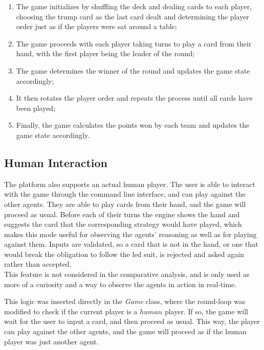 \documentclass[sigconf]{acmart}
\begin{document}
\begin{itemize}
  \begin{enumerate}[label=\arabic*]
    \item The game initializes by shuffling the deck and dealing cards to each player, choosing the trump card as the last card dealt and determining the player order just as if the players were sat around a table;
    \item The game proceeds with each player taking turns to play a card from their hand, with the first player being the leader of the round;
    \item The game determines the winner of the round and updates the game state accordingly;
    \item It then rotates the player order and repeats the process until all cards have been played;
    \item Finally, the game calculates the points won by each team and updates the game state accordingly.
  \end{enumerate}

\end{itemize}

\subsection{Human Interaction}

The platform also supports an actual human player. The user is able to interact with the game through the command line interface, and can play against the other agents. They are able to play cards from their hand, and the game will proceed as usual. Before each of their turns the engine shows the hand and suggests the card that the corresponding strategy would have played, which makes this mode useful for observing the agents' reasoning as well as for playing against them. Inputs are validated, so a card that is not in the hand, or one that would break the obligation to follow the led suit, is rejected and asked again rather than accepted.\\
This feature is not considered in the comparative analysis, and is only used as more of a curiosity and a way to observe the agents in action in real-time.

\noindent This logic was inserted directly in the \textit{Game} class, where the round-loop was modified to check if the current player is a $human$ player. If so, the game will wait for the user to input a card, and then proceed as usual. This way, the player can play against the other agents, and the game will proceed as if the human player was just another agent.
\end{document}
